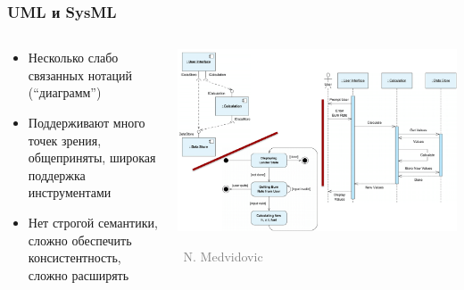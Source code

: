 \documentclass[xetex,mathserif,serif]{beamer}
\newcommand{\attribution}[1] {
	\vspace{-5mm}\begin{flushright}\begin{scriptsize}\textcolor{gray}{\textcopyright\, #1}\end{scriptsize}\end{flushright}
}
\begin{document}
	\begin{frame}
		\frametitle{UML и SysML}
		\begin{columns}
			\begin{column}{0.4\textwidth}
				\begin{small}
					\begin{itemize}
						\item Несколько слабо связанных нотаций (``диаграмм'')
						\item Поддерживают много точек зрения, общеприняты, широкая поддержка инструментами
						\item Нет строгой семантики, сложно обеспечить консистентность, сложно расширять
					\end{itemize}
				\end{small}
			\end{column}
			\begin{column}{0.6\textwidth}
				\begin{center}
					\includegraphics[width=\textwidth]{uml.png}
					\attribution{N. Medvidovic}
				\end{center}
			\end{column}
		\end{columns}
	\end{frame}
\end{document}
